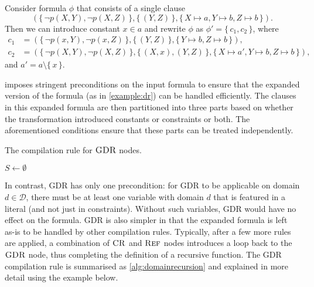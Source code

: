 \begin{example}\label{example:dr}
  Consider formula $\phi$ that consists of a single clause
  \[
    (\{\, \neg p(X, Y), \neg p(X, Z) \,\}, \{\, (Y, Z) \,\}, \{\, X \mapsto a, Y \mapsto b, Z \mapsto b \,\}).
  \]
  Then we can introduce constant $x \in a$ and rewrite $\phi$ as $\phi' = \{\, c_{1}, c_{2} \,\}$, where
  \begin{align*}
    c_{1} &= (\{\, \neg p(x, Y), \neg p(x, Z) \,\}, \{\, (Y, Z) \,\}, \{\, Y \mapsto b, Z \mapsto b \,\}), \\
    c_{2} &= (\{\, \neg p(X, Y), \neg p(X, Z) \,\}, \{\, (X, x), (Y, Z) \,\}, \{\, X \mapsto a', Y \mapsto b, Z \mapsto b \,\}),
  \end{align*}
  and $a' = a \setminus \{\, x \,\}$.
\end{example}

\citet{DBLP:conf/nips/Broeck11} imposes stringent preconditions on the input
formula to ensure that the expanded version of the formula (as in
\cref{example:dr}) can be handled efficiently. The clauses in this expanded
formula are then partitioned into three parts based on whether the transformation
introduced constants or constraints or both. The aforementioned conditions
ensure that these parts can be treated independently.

\begin{algorithm}[t]
  \caption{The compilation rule for $\operatorname{\textsc{GDR}}$ nodes.}\label{alg:domainrecursion}
  $S \gets \emptyset$\;
\end{algorithm}

In contrast, GDR has only one precondition: for GDR to be applicable on domain
$d \in \mathcal{D}$, there must be at least one variable with domain $d$ that is
featured in a literal (and not just in constraints). Without such variables, GDR
would have no effect on the formula. GDR is also simpler in that the expanded
formula is left as-is to be handled by other compilation rules. Typically, after
a few more rules are applied, a combination of $\operatorname{\textsc{CR}}$ and $\operatorname{\textsc{Ref}}$ nodes
introduces a loop back to the $\operatorname{\textsc{GDR}}$ node, thus completing the definition of a
recursive function. The GDR compilation rule is summarised as
\cref{alg:domainrecursion} and explained in more detail using the example below.

